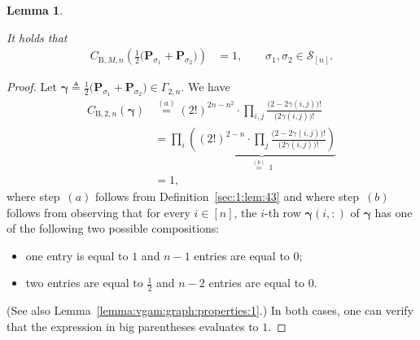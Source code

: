 \documentclass[journal,lettersize,twocolumn]{IEEEtran} %
\newtheorem{lemma}[theorem]{Lemma}
\newcommand{\vect}[1]{ \bm{#1} }
\newcommand{\set}[1]{\mathcal{#1}}
\newcommand{\vgam}{ \vect{\gamma} }
\newcommand{\matr}[1]{ \bm{#1} }
\newcommand{\defeq}{ \triangleq }
\newcommand{\setS}{\set{S}}
\newcommand{\CBM}[1]{\CBgen{M}{#1}}
\newcommand{\CBtwo}[1]{\CBgen{2}{#1}}
\newcommand{\CBgen}[2]{C_{\mathrm{B},#1,#2}}
\newcommand{\mP}{\matr{P}}
\newcommand{\Gamtwon}{ \Gamma_{2,n} }
\begin{document}
\begin{appendices}
%

\begin{lemma}
  \label{lemma:CBMtwo:properties:1}

  It holds that
  \begin{align*}
    \CBM{n}
      \left(
        \frac{1}{2} 
        \bigl( 
          \mP_{\sigma_1} \! + \! \mP_{\sigma_2} 
        \bigr)
      \right)
      &= 1, 
           \qquad \sigma_1, \sigma_2 \in \setS_{[n]}.
  \end{align*}
\end{lemma}

%

\begin{proof}
  Let
  $\vgam \defeq \frac{1}{2} \bigl( \mP_{\sigma_1} \! + \! \mP_{\sigma_2}
  \bigr) \in \Gamtwon$. We have
  \begin{align*}
    \CBtwo{n}(\vgam) 
      &\overset{(a)}{=}
         (2!)^{ 2n -  n^2} 
           \cdot
           \prod_{i,j}
             \frac{ \bigl(2 - 2 \gamma(i,j) \bigr)! }
                  { \bigl(2 \gamma(i,j) \bigr)! } \\
      &= \prod_i
           \underbrace
           {
             \left(
               (2!)^{ 2 -  n} 
               \cdot
               \prod_j
                 \frac{ \bigl(2 - 2 \gamma(i,j) \bigr)! }
                      { \bigl(2 \gamma(i,j) \bigr)! }
             \right)
           }_{\overset{(b)}{=} \ 1} \\
      &= 1,
  \end{align*}
  where step~$(a)$ follows from Definition~\ref{sec:1:lem:43} and where
  step~$(b)$ follows from observing that for every $i \in [n]$, the $i$-th row
  $\vgam(i,:)$ of $\vgam$ has one of the following two possible compositions:
  \begin{itemize}
  
  \item one entry is equal to $1$ and $n - 1$ entries are equal to $0$;
  
  \item two entries are equal to $\frac{1}{2}$ and $n - 2$ entries are equal
    to $0$.

  \end{itemize}
  (See also Lemma~\ref{lemma:vgam:graph:properties:1}.) In both cases, one can
  verify that the expression in big parentheses evaluates to $1$.
\end{proof}


\end{appendices}
\end{document}
